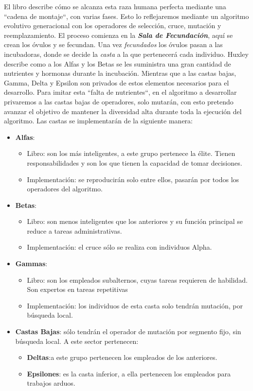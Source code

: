 El libro describe cómo se alcanza esta raza humana perfecta mediante una ``cadena de montaje``, con varias fases. Esto lo 
reflejaremos mediante un algoritmo evolutivo generacional con los operadores de selección, cruce, mutación y reemplazamiento. 
El proceso comienza en la \textbf{\textit{Sala de Fecundación}}, aquí se crean los óvulos y se fecundan. Una vez \textit{fecundados}
los óvulos pasan a las incubadoras, donde se decide la \textit{casta} a la que pertenecerá cada individuo. Huxley describe 
como a los Alfas y los Betas se les suministra una gran cantidad de nutrientes y hormonas durante la incubación. Mientras que a las 
castas bajas, Gamma, Delta y Epsilon son privados de estos elementos necesarios para el desarrollo. Para imitar esta
 ``falta de nutrientes``, en el algoritmo a desarrollar privaremos a las castas bajas de operadores, solo mutarán, con esto
 pretendo avanzar el objetivo de mantener la diversidad alta durante toda la ejecución del algoritmo. 
 Las castas se implementarán de la siguiente manera: 

\begin{itemize}
    \item \textbf{Alfas}:
        \begin{itemize}
            \item Libro: son los más inteligentes, a este grupo pertenece la élite. Tienen responsabilidades y son
            los que tienen la capacidad de tomar decisiones.
            \item Implementación: se reproducirán solo entre ellos, pasarán por todos los operadores del algoritmo.
        \end{itemize}
    \item \textbf{Betas}: 
        \begin{itemize}
            \item Libro: son menos inteligentes que los anteriores y su función principal se reduce a tareas
            administrativas.
            \item  Implementación: el cruce sólo se realiza con individuos Alpha.
        \end{itemize}
    \item \textbf{Gammas}: 
        \begin{itemize}
            \item Libro: son los empleados subalternos, cuyas tareas requieren de habilidad. Son expertos en tareas repetitivas
            \item Implementación: los individuos de esta casta solo tendrán mutación, por búsqueda local.
        \end{itemize}
    \item \textbf{Castas Bajas}: sólo tendrán el operador de mutación por segmento fijo, sin búsqueda local. A este sector pertenecen:
        \begin{itemize}
            \item \textbf{Deltas}:a este grupo pertenecen los empleados de los anteriores.
            \item \textbf{Epsilones}: es la casta inferior, a ella pertenecen los empleados para trabajos arduos.
        \end{itemize}
\end{itemize}

